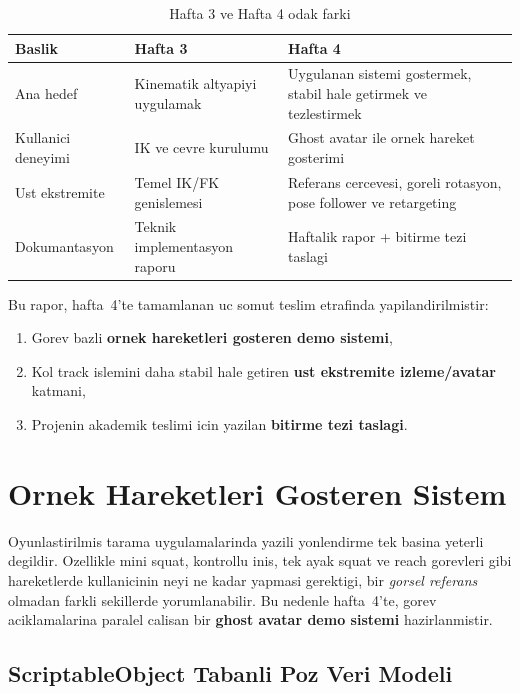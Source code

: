 \documentclass[11pt,a4paper]{article}
\begin{document}
\begin{table}[H]
\centering
\caption{Hafta 3 ve Hafta 4 odak farki}
\label{tab:hafta34}
\renewcommand{\arraystretch}{1.25}
\begin{tabularx}{\textwidth}{lXX}
\toprule
\textbf{Baslik} & \textbf{Hafta 3} & \textbf{Hafta 4} \\
\midrule
Ana hedef & Kinematik altyapiyi uygulamak & Uygulanan sistemi gostermek, stabil hale getirmek ve tezlestirmek \\
Kullanici deneyimi & IK ve cevre kurulumu & Ghost avatar ile ornek hareket gosterimi \\
Ust ekstremite & Temel IK/FK genislemesi & Referans cercevesi, goreli rotasyon, pose follower ve retargeting \\
Dokumantasyon & Teknik implementasyon raporu & Haftalik rapor + bitirme tezi taslagi \\
\bottomrule
\end{tabularx}
\end{table}

Bu rapor, hafta~4'te tamamlanan uc somut teslim etrafinda yapilandirilmistir:
\begin{enumerate}[nosep]
    \item Gorev bazli \textbf{ornek hareketleri gosteren demo sistemi},
    \item Kol track islemini daha stabil hale getiren \textbf{ust ekstremite izleme/avatar} katmani,
    \item Projenin akademik teslimi icin yazilan \textbf{bitirme tezi taslagi}.
\end{enumerate}

\section{Ornek Hareketleri Gosteren Sistem}
\label{sec:demo}

Oyunlastirilmis tarama uygulamalarinda yazili yonlendirme tek basina yeterli
degildir. Ozellikle mini squat, kontrollu inis, tek ayak squat ve reach
gorevleri gibi hareketlerde kullanicinin neyi ne kadar yapmasi gerektigi,
bir \textit{gorsel referans} olmadan farkli sekillerde yorumlanabilir.
Bu nedenle hafta~4'te, gorev aciklamalarina paralel calisan bir
\textbf{ghost avatar demo sistemi} hazirlanmistir.

\subsection{ScriptableObject Tabanli Poz Veri Modeli}
\end{document}
